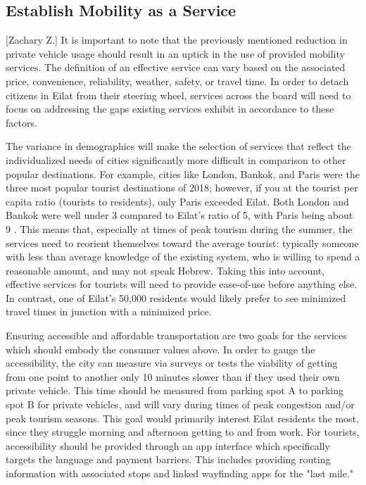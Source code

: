 \documentclass[12pt]{article}                       %
\begin{document}
\subsection{Establish Mobility as a Service}[Zachary Z.]    
It is important to note that the previously mentioned reduction in private vehicle usage should result in an uptick in the use of provided mobility services. The definition of an effective service can vary based on the associated price, convenience, reliability, weather, safety, or travel time. In order to detach citizens in Eilat from their steering wheel, services across the board will need to focus on addressing the gaps existing services exhibit in accordance to these factors. 

The variance in demographics will make the selection of services that reflect the individualized needs of cities significantly more difficult in comparison to other popular destinations. For example, cities like London, Bankok, and Paris were the three most popular tourist destinations of 2018; however, if you at the tourist per capita ratio (tourists to residents), only Paris exceeded Eilat. Both London and Bankok were well under 3 compared to Eilat's ratio of 5, with Paris being about 9 \cite{Murray2018MostInsider}. This means that, especially at times of peak tourism during the summer, the services need to reorient themselves toward the average tourist: typically someone with less than average knowledge of the existing system, who is willing to spend a reasonable amount, and may not speak Hebrew. Taking this into account, effective services for tourists will need to provide ease-of-use before anything else. In contrast, one of Eilat's 50,000 residents would likely prefer to see minimized travel times in junction with a minimized price. 

Ensuring accessible and affordable transportation are two goals for the services which should embody the consumer values above. In order to gauge the accessibility, the city can measure via surveys or tests the viability of getting from one point to another only 10 minutes slower than if they used their own private vehicle. This time should be measured from parking spot A to parking spot B for private vehicles, and will vary during times of peak congestion and/or peak tourism seasons. This goal would primarily interest Eilat residents the most, since they struggle morning and afternoon getting to and from work. For tourists, accessibility should be provided through an app interface which specifically targets the language and payment barriers. This includes providing routing information with associated stops and linked wayfinding apps for the "last mile."
\end{document}
